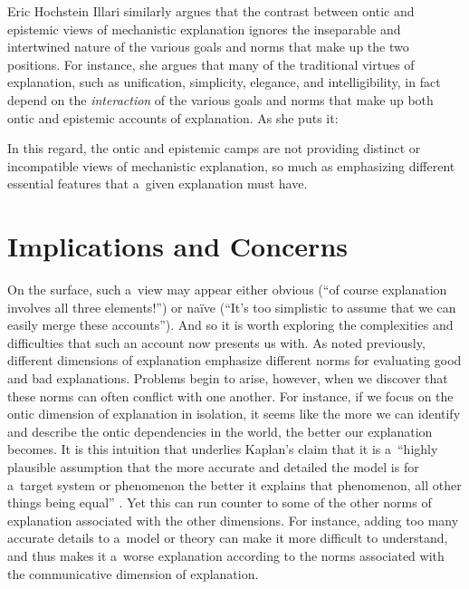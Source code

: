 \begin{artengenv}{Eric Hochstein}
Illari
\parencite*[][]{illari_mechanistic_2013} %
 similarly argues that the contrast between ontic and epistemic views of mechanistic explanation ignores the inseparable and intertwined nature of the various goals and norms that make up the two positions. For instance, she argues that many of the traditional virtues of explanation, such as unification, simplicity, elegance, and intelligibility, in fact depend on the \textit{interaction} of the various goals and norms that make up both ontic and epistemic accounts of explanation. As she puts it:


In this regard, the ontic and epistemic camps are not providing distinct or incompatible views of mechanistic explanation, so much as emphasizing different essential features that a~given explanation must have.

\section{Implications and Concerns}
On the surface, such a~view may appear either obvious (``of course explanation involves all three elements!'') or naïve (``It's too simplistic to assume that we can easily merge these accounts''). And so it is worth exploring the complexities and difficulties that such an account now presents us with. As noted previously, different dimensions of explanation emphasize different norms for evaluating good and bad explanations. Problems begin to arise, however, when we discover that these norms can often conflict with one another. For instance, if we focus on the ontic dimension of explanation in isolation, it seems like the more we can identify and describe the ontic dependencies in the world, the better our explanation becomes. It is this intuition that underlies Kaplan's claim that it is a~``highly plausible assumption that the more accurate and detailed the model is for a~target system or phenomenon the better it explains that phenomenon, all other things being equal''
\parencite[][p.347]{kaplan_explanation_2011}. %
 Yet this can run counter to some of the other norms of explanation associated with the other dimensions. For instance, adding too many accurate details to a~model or theory can make it more difficult to understand, and thus makes it a~worse explanation according to the norms associated with the communicative dimension of explanation.


\end{artengenv}
